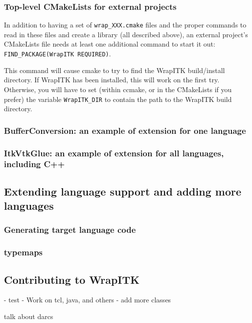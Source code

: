 \documentclass{InsightArticle}
\begin{document}
    \subsubsection{Top-level CMakeLists for external projects}
In addition to having a set of \verb$wrap_XXX.cmake$ files and the proper
commands to read in these files and create a library (all described above), an
external project's CMakeLists file needs at least one additional command to
start it out: \verb$FIND_PACKAGE(WrapITK REQUIRED)$.

This command will cause cmake to try to find the WrapITK build/install
directory. If WrapITK has been installed, this will work on the first try.
Otherwise, you will have to set (within ccmake, or in the CMakeLists if you
prefer) the variable \verb$WrapITK_DIR$ to contain the path to the WrapITK build
directory.

    \subsubsection{BufferConversion: an example of extension for one language}

    \subsubsection{ItkVtkGlue: an example of extension for all languages, including C++}

  \subsection{Extending language support and adding more languages}

    \subsubsection{Generating target language code}

    \subsubsection{typemaps}

  \subsection{Contributing to WrapITK}

- test
- Work on tcl, java, and others
- add more classes

talk about darcs
\end{document}
